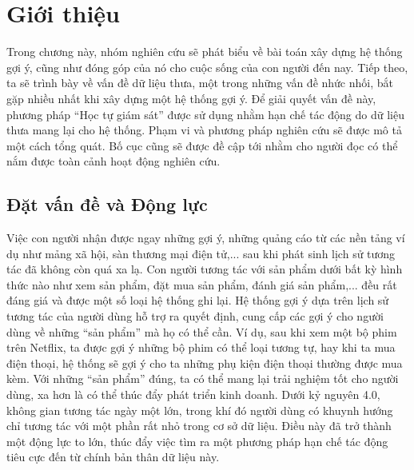 \chapter{Giới thiệu}
\label{Chapter1}



\noindent Trong chương này, nhóm nghiên cứu sẽ phát biểu về bài toán xây dựng hệ thống gợi ý, cũng như đóng góp của nó cho cuộc sống của con người đến nay. Tiếp theo, ta sẽ trình bày về vấn đề dữ liệu thưa, một trong những vấn đề nhức nhối, bắt gặp nhiều nhất khi xây dựng một hệ thống gợi ý. Để giải quyết vấn đề này, phương pháp ``Học tự giám sát'' được sử dụng nhằm hạn chế tác động do dữ liệu thưa mang lại cho hệ thống. Phạm vi và phương pháp nghiên cứu sẽ được mô tả một cách tổng quát. Bố cục cũng sẽ được đề cập tới nhằm cho người đọc có thể nắm được toàn cảnh hoạt động nghiên cứu.

\section{Đặt vấn đề và Động lực}

\noindent Việc con người nhận được ngay những gợi ý, những quảng cáo từ các nền tảng ví dụ như mảng xã hội, sàn thương mại điện tử,... sau khi phát sinh lịch sử tương tác đã không còn quá xa lạ. Con người tương tác với sản phẩm dưới bất kỳ hình thức nào như xem sản phẩm, đặt mua sản phẩm, đánh giá sản phẩm,... đều rất đáng giá và được một số loại hệ thống ghi lại. Hệ thống gợi ý dựa trên lịch sử tương tác của người dùng hỗ trợ ra quyết định, cung cấp các gợi ý cho người dùng về những ``sản phẩm'' mà họ có thể cần. Ví dụ, sau khi xem một bộ phim trên Netflix, ta được gợi ý những bộ phim có thể loại tương tự, hay khi ta mua điện thoại, hệ thống sẽ gợi ý cho ta những phụ kiện điện thoại thường được mua kèm. Với những ``sản phẩm'' đúng, ta có thể mang lại trải nghiệm tốt cho người dùng, xa hơn là có thể thúc đẩy phát triển kinh doanh. Dưới kỷ nguyên 4.0, không gian tương tác ngày một lớn, trong khí đó người dùng có khuynh hướng chỉ tương tác với một phần rất nhỏ trong cơ sở dữ liệu. Điều này đã trở thành một động lực to lớn, thúc đẩy việc tìm ra một phương pháp hạn chế tác động tiêu cực đến từ chính bản thân dữ liệu này.

